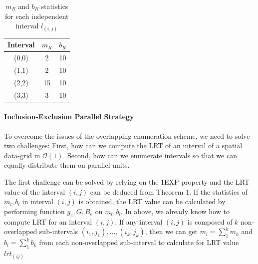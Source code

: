 \documentclass[AMA,LATO1COL]{WileyNJD-v2}
\newcommand\bigo{\mathcal O}
\begin{document}
\begin{table}[t]
\centering \caption{ $m_R$ and $b_R$ statistics for each independent interval $l_(i,j)$\label{tab:mb}}
     \begin{tabular}{|c|c|c|}
	\hline
    Interval  &  $m_R$ & $b_R$ \\
	\hline
    (0,0)  &  2 &  10 \\
    \hline
    (1,1)  & 2&  10 \\
    \hline
    (2,2)  &  15& 10 \\
    \hline
     (3,3) & 3  & 10  \\
    \hline
\end{tabular}
\label{lrt-compute}
\end{table}


\paragraph{Inclusion-Exclusion Parallel Strategy}

To overcome the issues of the overlapping enumeration scheme, we need to solve two challenges:
First, how can we compute the LRT of an interval of a spatial data-grid in $\bigo(1)$. Second, how
can we enumerate intervals so that we can equally distribute them on parallel units.

The first challenge can be solved by relying on the 1EXP property and the LRT value of the interval $(i,j)$ can be deduced from Theorem 1. If the statistics of $m_l, b_l$ in interval $(i,j)$ is obtained, the LRT value can be calculated by performing function $g_e,G,B_e$ on $m_l, b_l$. In above, we already know how to compute LRT for an interval $(i,j)$. If any interval $(i,j)$ is composed of $k$ non-overlapped sub-intervals $(i_1,j_1),...,(i_k,j_k)$, then we can get $m_l=\sum_{1}^{k} m_k$ and $b_l=\sum_{1}^{k} b_k$ from each non-overlapped sub-interval to calculate for LRT value $lrt_{(ij)}$
\end{document}
